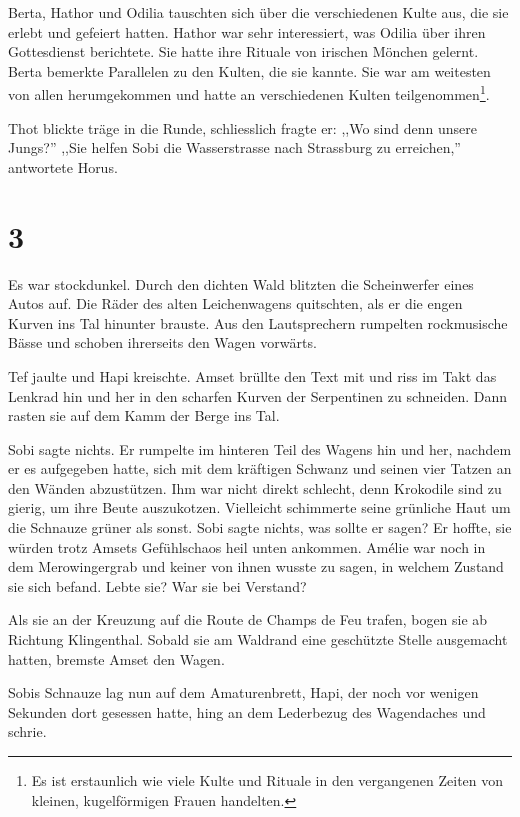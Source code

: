 \documentclass[11pt,titlepage,a5paper]{book}
\begin{document}
Berta, Hathor und Odilia tauschten sich über die verschiedenen Kulte aus, die sie erlebt und gefeiert hatten. Hathor war sehr interessiert, was Odilia über ihren Gottesdienst berichtete. Sie hatte ihre Rituale von irischen Mönchen gelernt. Berta bemerkte Parallelen zu den Kulten, die sie kannte. Sie war am weitesten von allen herumgekommen und hatte an verschiedenen Kulten teilgenommen\footnote{Es ist erstaunlich wie viele Kulte und Rituale in den vergangenen Zeiten von kleinen, kugelförmigen Frauen handelten.}. 

Thot blickte träge in die Runde, schliesslich fragte er: ,,Wo sind denn unsere Jungs?'' ,,Sie helfen Sobi die Wasserstrasse nach Strassburg zu erreichen,'' antwortete Horus.

\section*{3}

 Es war stockdunkel. Durch den dichten Wald blitzten die Scheinwerfer eines Autos auf. Die Räder des alten Leichenwagens quitschten, als er die engen Kurven ins Tal hinunter brauste. Aus den Lautsprechern rumpelten rockmusische Bässe und schoben ihrerseits den Wagen vorwärts. 

Tef jaulte und Hapi kreischte. Amset brüllte den Text mit und riss im Takt das Lenkrad hin und her in den scharfen Kurven der Serpentinen zu schneiden. Dann rasten sie auf dem Kamm der Berge ins Tal.

Sobi sagte nichts. Er rumpelte im hinteren Teil des Wagens hin und her, nachdem er es aufgegeben hatte, sich mit dem kräftigen Schwanz und seinen vier Tatzen an den Wänden abzustützen. Ihm war nicht direkt schlecht, denn Krokodile sind zu gierig, um ihre Beute auszukotzen. Vielleicht schimmerte seine grünliche Haut um die Schnauze grüner als sonst. Sobi sagte nichts, was sollte er sagen? Er hoffte, sie würden trotz Amsets Gefühlschaos heil unten ankommen. Amélie war noch in dem Merowingergrab und keiner von ihnen wusste zu sagen, in welchem Zustand sie sich befand. Lebte sie? War sie bei Verstand?

Als sie an der Kreuzung auf die Route de Champs de Feu trafen, bogen sie ab Richtung Klingenthal. Sobald sie am Waldrand eine geschützte Stelle ausgemacht hatten, bremste Amset den Wagen. 

Sobis Schnauze lag nun auf dem Amaturenbrett, Hapi, der noch vor wenigen Sekunden dort gesessen hatte, hing an dem Lederbezug des Wagendaches und schrie.
\end{document}
